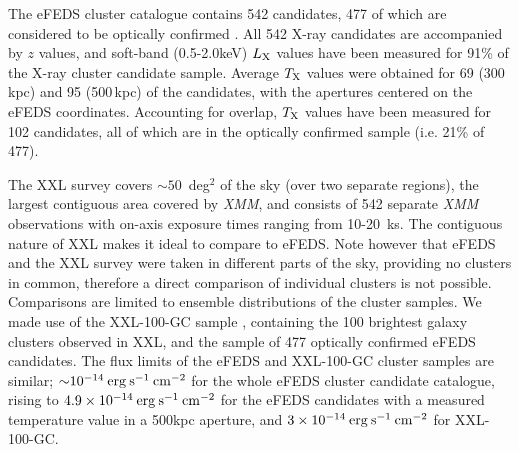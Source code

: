 \documentclass[fleqn,usenatbib]{mnras}
\begin{document}
The eFEDS cluster catalogue \citep{efedsclustercat} contains 542 candidates, 477 of which are considered to be optically confirmed \citep{efedsclusteropticalcat}. All 542 X-ray candidates are accompanied by $z$ values, and soft-band (0.5-2.0keV) $L_{\rm X}$ values have been measured for 91\% of the X-ray cluster candidate sample. Average $T_{\rm X}$ values were obtained for 69 (300\,kpc) and 95 (500\,kpc) of the candidates, with the apertures centered on the eFEDS coordinates. Accounting for overlap, $T_{\rm X}$ values have been measured for 102 candidates, all of which are in the optically confirmed sample (i.e. 21\% of 477).

The XXL survey \citep{xxlfoundation} covers ${\sim}50$~deg$^2$ of the sky (over two separate regions), the largest contiguous area covered by {\em XMM}, and consists of 542 separate {\em XMM} observations with on-axis exposure times ranging from 10-20~ks.  The contiguous nature of XXL makes it ideal to compare to eFEDS.  Note however that eFEDS and the XXL survey were taken in different parts of the sky, providing no clusters in common, therefore a direct comparison of individual clusters is not possible. Comparisons are limited to ensemble distributions of the cluster samples.  We made use of the XXL-100-GC sample \citep{xxlgc100}, containing the 100 brightest galaxy clusters observed in XXL, and the sample of 477 optically confirmed eFEDS candidates.  The flux limits of the eFEDS and XXL-100-GC cluster samples are similar; ${\sim}10^{-14}\:\rm{erg}\:\rm{s}^{-1}\:\rm{cm}^{-2}$ for the whole eFEDS cluster candidate catalogue, rising to $4.9\times10^{-14}\:\rm{erg}\:\rm{s}^{-1}\:\rm{cm}^{-2}$ for the eFEDS candidates with a measured temperature value in a 500kpc aperture, and $3\times10^{-14}\:\rm{erg}\:\rm{s}^{-1}\:\rm{cm}^{-2}$ for XXL-100-GC. 
\end{document}
